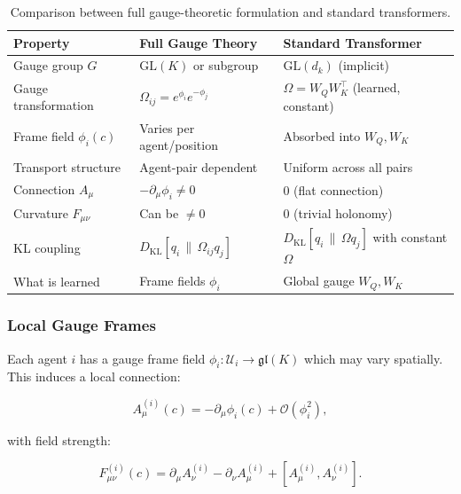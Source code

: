 \documentclass[twoside,11pt]{article}
\begin{document}
\begin{table}[h]
\centering
\renewcommand{\arraystretch}{1.2}
\setlength{\tabcolsep}{6pt}
\begin{tabularx}{\textwidth}{lXX}
\hline
\textbf{Property} &
\textbf{Full Gauge Theory} &
\textbf{Standard Transformer} \\
\hline
Gauge group $G$ &
$\mathrm{GL}(K)$ or subgroup &
$\mathrm{GL}(d_k)$ (implicit) \\
Gauge transformation &
$\Omega_{ij} = e^{\phi_i} e^{-\phi_j}$ &
$\Omega = W_Q W_K^\top$ (learned, constant) \\
Frame field $\phi_i(c)$ &
Varies per agent/position &
Absorbed into $W_Q, W_K$ \\
Transport structure &
Agent-pair dependent &
Uniform across all pairs \\
Connection $A_\mu$ &
$-\partial_\mu \phi_i \neq 0$ &
$0$ (flat connection) \\
Curvature $F_{\mu\nu}$ &
Can be $\neq 0$ &
$0$ (trivial holonomy) \\
KL coupling &
$D_{\text{KL}}[q_i \,\|\, \Omega_{ij} q_j]$ &
$D_{\text{KL}}[q_i \,\|\, \Omega q_j]$ with constant $\Omega$ \\
What is learned &
Frame fields $\phi_i$ &
Global gauge $W_Q, W_K$ \\
\hline
\end{tabularx}
\caption{Comparison between full gauge-theoretic formulation and standard transformers.}
\label{tab:gauge_vs_transformer}
\end{table}





\subsubsection{Local Gauge Frames}
Each agent $i$ has a gauge frame field $\phi_i: \mathcal{U}_i \to \mathfrak{gl}(K)$ which may vary spatially.  This induces a local connection:

\begin{equation}
A^{(i)}_\mu(c) = -\partial_\mu \phi_i(c) + \mathcal{O}(\phi_i^2),
\end{equation}

with field strength:

\begin{equation}
F^{(i)}_{\mu\nu}(c) = \partial_\mu A^{(i)}_\nu - \partial_\nu A^{(i)}_\mu + [A^{(i)}_\mu, A^{(i)}_\nu].
\end{equation}
\end{document}
